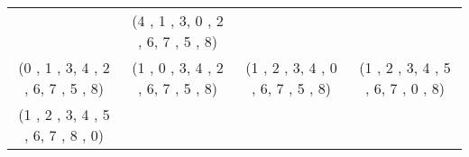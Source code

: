 \documentclass[11pt]{article}
\begin{document}
\begin{tabular}{c c c c}
&

(4 , 1 , 3,
0 , 2 , 6,
7 , 5 , 8)

\\

(0 , 1 , 3,
4 , 2 , 6,
7 , 5 , 8)

&

(1 , 0 , 3,
4 , 2 , 6,
7 , 5 , 8)

&

(1 , 2 , 3,
4 , 0 , 6,
7 , 5 , 8)

&

(1 , 2 , 3,
4 , 5 , 6,
7 , 0 , 8)

\\

(1 , 2 , 3,
4 , 5 , 6,
7 , 8 , 0)

&

&

&

\\
\end{tabular}
\clearpage
\end{document}
